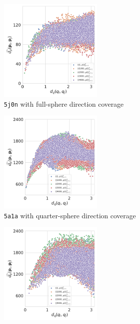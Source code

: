 \begin{figure}[ht!]
    \begin{minipage}[t]{0.99\linewidth}
        \begin{subfigure}[t]{0.31\textwidth}
            \centering
            \includegraphics[height=5cm]{figures/dPdQ_5j0n_euclidean2}
            \caption{\texttt{5j0n} with full-sphere direction coverage}
        \end{subfigure}
        \hfill
        \begin{subfigure}[t]{0.31\textwidth}
            \centering
            \includegraphics[height=5cm]{figures/dPdQ_5a1a_euclidean2}
            \caption{\texttt{5a1a} with quarter-sphere direction coverage}
        \end{subfigure}
        \hfill
        \begin{subfigure}[t]{0.31\textwidth}
            \centering
            \includegraphics[height=5cm]{figures/dPdQ_5a1a_full_euclidean2}

\end{subfigure}
\end{minipage}
\end{figure}
